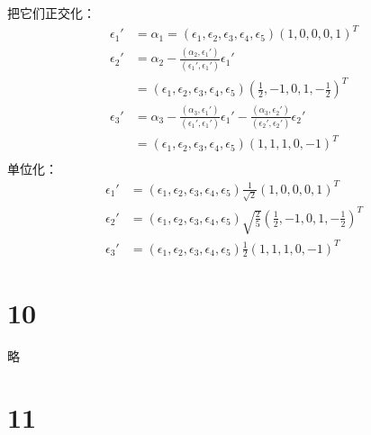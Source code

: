 \documentclass{article}
\begin{document}
把它们正交化：
\begin{align*}
  \epsilon_1' & = \alpha_1 = (\epsilon_1, \epsilon_2, \epsilon_3, \epsilon_4, \epsilon_5) (1, 0, 0, 0, 1)^T                                                                  \\
  \epsilon_2' & = \alpha_2 - \frac{(\alpha_2, \epsilon_1')}{(\epsilon_1', \epsilon_1')} \epsilon_1'                                                                          \\
              & = (\epsilon_1, \epsilon_2, \epsilon_3, \epsilon_4, \epsilon_5) (\frac{1}{2}, -1, 0, 1, -\frac{1}{2})^T                                                       \\
  \epsilon_3' & = \alpha_3 - \frac{(\alpha_3, \epsilon_1')}{(\epsilon_1', \epsilon_1')} \epsilon_1' - \frac{(\alpha_3, \epsilon_2')}{(\epsilon_2', \epsilon_2')} \epsilon_2' \\
              & = (\epsilon_1, \epsilon_2, \epsilon_3, \epsilon_4, \epsilon_5) (1, 1, 1, 0, -1)^T                                                                            \\
\end{align*}
单位化：
\begin{align*}
  \epsilon_1' & = (\epsilon_1, \epsilon_2, \epsilon_3, \epsilon_4, \epsilon_5) \frac{1}{\sqrt{2}} (1, 0, 0, 0, 1)^T                       \\
  \epsilon_2' & = (\epsilon_1, \epsilon_2, \epsilon_3, \epsilon_4, \epsilon_5) \sqrt{\frac{2}{5}} (\frac{1}{2}, -1, 0, 1, -\frac{1}{2})^T \\
  \epsilon_3' & = (\epsilon_1, \epsilon_2, \epsilon_3, \epsilon_4, \epsilon_5) \frac{1}{2} (1, 1, 1, 0, -1)^T
\end{align*}

\section*{10}

略

\section*{11}
\end{document}
